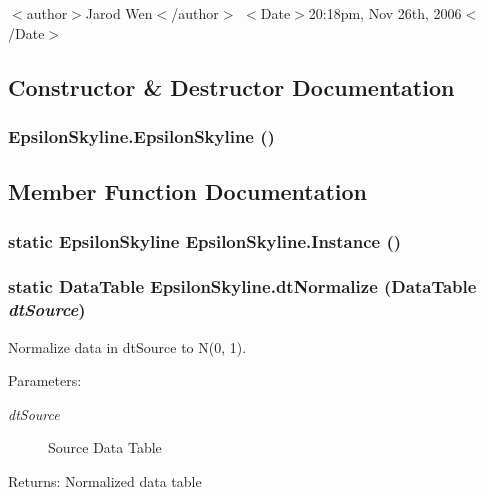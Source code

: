 $<$author$>$Jarod Wen$<$/author$>$ $<$Date$>$20:18pm, Nov 26th, 2006$<$/Date$>$ 



\subsection{Constructor \& Destructor Documentation}
\subsubsection{\setlength{\rightskip}{0pt plus 5cm}Epsilon\-Skyline.Epsilon\-Skyline ()}\label{class_epsilon_skyline_72a126a4d0d3d677b0e6b30d7785cfd2}




\subsection{Member Function Documentation}
\subsubsection{\setlength{\rightskip}{0pt plus 5cm}static {\bf Epsilon\-Skyline} Epsilon\-Skyline.Instance ()\hspace{0.3cm}{\tt  [static]}}\label{class_epsilon_skyline_916975cc1add75e369f0c39f8a9609d0}


\subsubsection{\setlength{\rightskip}{0pt plus 5cm}static Data\-Table Epsilon\-Skyline.dt\-Normalize (Data\-Table {\em dt\-Source})\hspace{0.3cm}{\tt  [static]}}\label{class_epsilon_skyline_1a71cdb83a2b17c45ec117f5538c3fac}


Normalize data in dt\-Source to N(0, 1). 

\begin{Desc}
\item[Parameters:]
\begin{description}
\item[{\em dt\-Source}]Source Data Table\end{description}
\end{Desc}
\begin{Desc}
\item[Returns:]Normalized data table\end{Desc}
